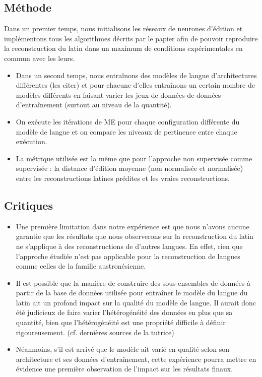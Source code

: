 \documentclass[12pt, french, twoside]{report}
\begin{document}
\subsection{Méthode}
Dans un premier temps, nous initialisons les réseaux de neurones d'édition et implémentons tous les algorithmes décrits par le papier afin de pouvoir reproduire la reconstruction du latin dans un maximum de conditions expérimentales en commun avec les leurs.
\begin{itemize}
    \item Dans un second temps, nous entraînons des modèles de langue d'architectures différentes (les citer) et pour chacune d'elles entraînons un certain nombre de modèles différents en faisant varier les jeux de données de données d'entraînement (surtout au niveau de la quantité).
    \item On exécute les itérations de ME pour chaque configuration différente du modèle de langue et on compare les niveaux de pertinence entre chaque exécution.
    \item La métrique utilisée est la même que pour l'approche non supervisée comme supervisée : la distance d'édition moyenne (non normalisée et normalisée) entre les reconstructions latines prédites et les vraies reconstructions.
\end{itemize}

\subsection{Critiques}
\begin{itemize}
    \item Une première limitation dans notre expérience est que nous n'avons aucune garantie que les résultats que nous observerons sur la reconstruction du latin ne s'applique à des reconstructions de d'autres langues. En effet, rien que l'approche étudiée n'est pas applicable pour la reconstruction de langues comme celles de la famille austronésienne.
    \item Il est possible que la manière de construire des sous-ensembles de données à partir de la base de données utilisée pour entraîner le modèle du langue du latin ait un profond impact sur la qualité du modèle de langue. Il aurait donc été judicieux de faire varier l'hétérogénéité des données en plus que sa quantité, bien que l'hétérogénéité est une propriété difficile à définir rigoureusement. (cf. dernières sources de la tutrice)
    \item Néanmoins, s'il est arrivé que le modèle ait varié en qualité selon son architecture et ses données d'entraînement, cette expérience pourra mettre en évidence une première observation de l'impact sur les résultats finaux.
\end{itemize}
\end{document}
